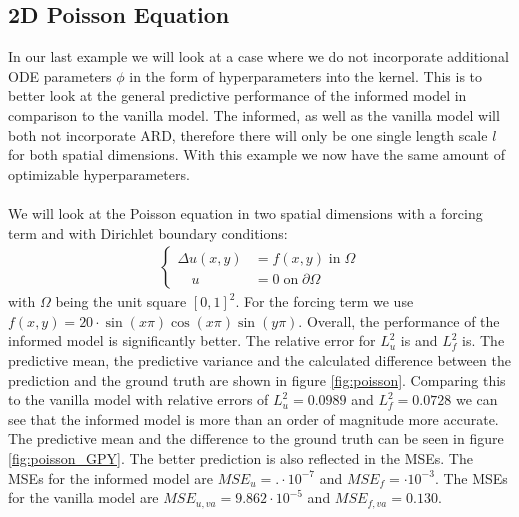 \documentclass{article}
\begin{document}
\subsection{2D Poisson Equation}
In our last example we will look at a case where we do not incorporate additional ODE parameters $\phi$ in the form of hyperparameters into the kernel. This is to better look at the general predictive performance of the informed model in comparison to the vanilla model. The informed, as well as the vanilla model will both not incorporate ARD, therefore there will only be one single length scale $l$ for both spatial dimensions. With this example we now have the same amount of optimizable hyperparameters. \\
\\
 We will look at the Poisson equation in two spatial dimensions with a
forcing term and with Dirichlet boundary conditions:
\begin{equation}
    \begin{aligned}
    {\displaystyle {\begin{cases}\Delta u(x,y)&=f(x,y) \; {\text{in}} \; \Omega \\\quad u&=0 \;{\text{on}} \; \partial \Omega \end{cases}}}
    \end{aligned}
\end{equation}
with $\Omega$ being the unit square $[0,1]^2$. For the forcing term we use $f(x,y) = 20 \cdot \sin(x\pi)\cos(x\pi)\sin(y\pi)$.
Overall, the performance of the informed model is significantly better. The relative error for $L^2_u$ is and $L^2_f$ is. The predictive mean, the predictive variance and the calculated difference between the prediction and the ground truth are shown in figure \ref{fig:poisson}. Comparing this to the vanilla model with relative errors of $L^2_u = 0.0989$ and $L^2_f = 0.0728$ we can see that the informed model is more than an order of magnitude more accurate. The predictive mean and the difference to the ground truth can be seen in figure \ref{fig:poisson_GPY}. The better prediction is also reflected in the MSEs. The MSEs for the informed model are $MSE_u = . \cdot 10^{-7}$ and $MSE_f =  \cdot 10^{-3}$. The MSEs for the vanilla model are $MSE_{u,va} = 9.862  \cdot 10^{-5}$ and $MSE_{f,va} = 0.130$.\\
\\
\end{document}
